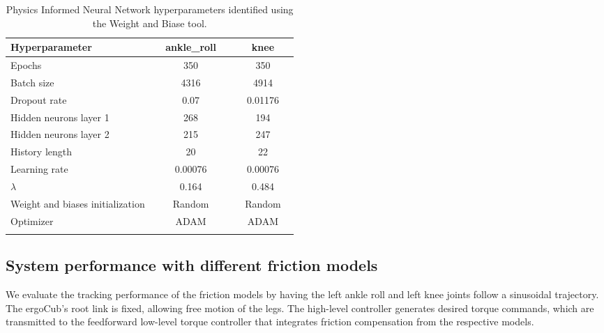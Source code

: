 \begin{table}[t]
\centering
\caption{Physics Informed Neural Network hyperparameters identified using the Weight and Biase tool.}
\begin{tabular}{p{0.5\linewidth}cc}
\hline
\textbf{Hyperparameter} & \textbf{ankle\_roll} & \textbf{knee} \\
\hline
Epochs                  & 350  &  350    \\
Batch size              & 4316  &  4914   \\
Dropout rate            & 0.07  &  0.01176  \\
Hidden neurons layer 1     & 268  & 194  \\
Hidden neurons layer 2     & 215  & 247  \\
History length          & 20    &  22  \\
Learning rate           & 0.00076  & 0.00076 \\
$\lambda$               & 0.164  &  0.484 \\
Weight and biases initialization   & Random & Random \\
Optimizer & ADAM & ADAM \\
\hline
\label{table:hyper}
\end{tabular}
\vspace{-25pt}
\end{table}

\subsection{System performance with different friction models}
We evaluate the tracking performance of the friction models by having the left ankle roll and left knee joints follow a sinusoidal trajectory. The ergoCub's root link is fixed, allowing free motion of the legs. The high-level controller generates desired torque commands, which are transmitted to the feedforward low-level torque controller that integrates friction compensation from the respective models.

